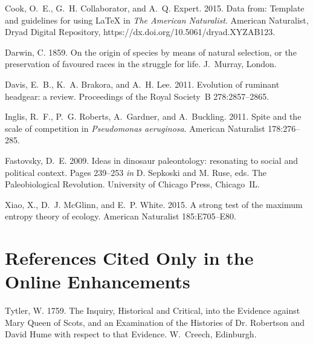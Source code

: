 \documentclass[11pt]{article}\usepackage[sc]{mathpazo} %
\begin{document}
\begin{thebibliography}{}

Cook, O.~E., G.~H. Collaborator, and A.~Q. Expert. 2015.
\newblock Data from: Template and guidelines for using \LaTeX{} in \textit{The American Naturalist}.
\newblock American Naturalist, Dryad Digital Repository, https://dx.doi.org/10.5061/dryad.XYZAB123.

Darwin, C. 1859.
\newblock On the origin of species by means of natural selection, or the preservation of favoured races in the struggle for life.
\newblock J.~Murray, London.

Davis, E.~B., K.~A. Brakora, and A.~H. Lee. 2011.
\newblock Evolution of ruminant headgear: a review.
\newblock Proceedings of the Royal Society~B 278:2857--2865.

Inglis, R.~F., P.~G. Roberts, A.~Gardner, and A.~Buckling. 2011.
\newblock Spite and the scale of competition in \textit{Pseudomonas
  aeruginosa}.
\newblock American Naturalist 178:276--285.

Fastovsky, D.~E. 2009.
\newblock Ideas in dinosaur paleontology: resonating to social and political context.
\newblock Pages 239--253 \emph{in} D. Sepkoski and M. Ruse, eds. The Paleobiological Revolution. University of Chicago Press, Chicago~IL.

Xiao, X., D.~J. McGlinn, and E.~P. White. 2015.
\newblock A strong test of the maximum entropy theory of ecology.
\newblock American Naturalist 185:E705--E80.

\section*{References Cited Only in the Online Enhancements}


Tytler, W. 1759.
\newblock The Inquiry, Historical and Critical, into the Evidence against Mary Queen of Scots, and an Examination of the Histories of Dr. Robertson and David Hume with respect to that Evidence.
\newblock W.~Creech, Edinburgh.

\end{thebibliography}
\end{document}
